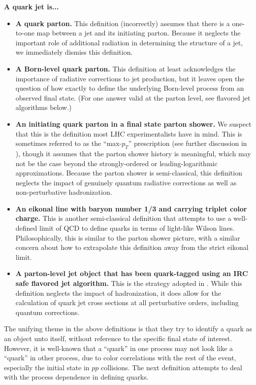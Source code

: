 \documentclass[11pt]{cernrep}
\begin{document}
\noindent \textbf{A quark jet is...}
\begin{itemize}
\item \textbf{A quark parton.}  This definition (incorrectly) assumes that there is a one-to-one map between a jet and its initiating parton.  Because it neglects the important role of additional radiation in determining the structure of a jet, we immediately dismiss this definition.
\item \textbf{A Born-level quark parton.}  This definition at least acknowledges the importance of radiative corrections to jet production, but it leaves open the question of how exactly to define the underlying Born-level process from an observed final state.  (For one answer valid at the parton level, see flavored jet algorithms below.)
\item \textbf{An initiating quark parton in a final state parton shower.}  We suspect that this is the definition most LHC experimentalists have in mind.  This is sometimes referred to as the ``max-$p_T$'' prescription (see further discussion in \cite{Buckley:2015gua}), though it assumes that the parton shower history is meaningful, which may not be the case beyond the strongly-ordered or leading-logarithmic approximations.  Because the parton shower is semi-classical, this definition neglects the impact of genuinely quantum radiative corrections as well as non-perturbative hadronization. 
\item \textbf{An eikonal line with baryon number 1/3 and carrying triplet color charge.}  This is another semi-classical definition that attempts to use a well-defined limit of QCD to define quarks in terms of light-like Wilson lines.  Philosophically, this is similar to the parton shower picture, with a similar concern about how to extrapolate this definition away from the strict eikonal limit.
\item \textbf{A parton-level jet object that has been quark-tagged using an IRC safe flavored jet algorithm.}  This is the strategy adopted in \cite{Banfi:2006hf}.  While this definition neglects the impact of hadronization, it does allow for the calculation of quark jet cross sections at all perturbative orders, including quantum corrections.
\end{itemize}
The unifying theme in the above definitions is that they try to identify a quark as an object unto itself, without reference to the specific final state of interest.  However, it is well-known that a ``quark'' in one process may not look like a ``quark'' in other process, due to color correlations with the rest of the event, especially the initial state in $pp$ collisions.  The next definition attempts to deal with the process dependence in defining quarks. 
\end{document}

